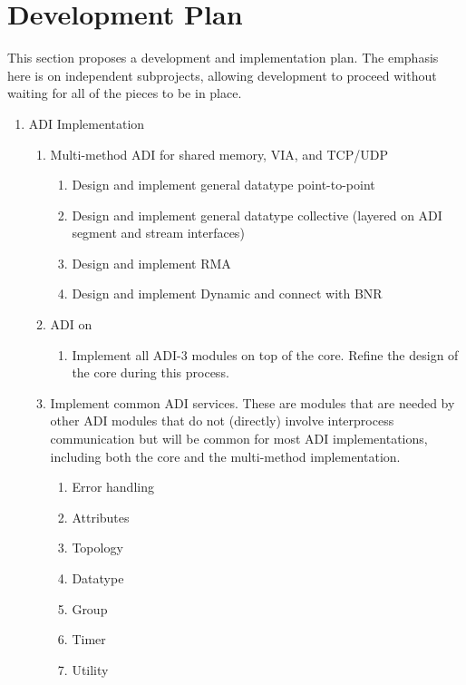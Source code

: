 \documentclass{article}
\begin{document}
\section{Development Plan}
\label{sec:development}
This section proposes a development and implementation plan.  The
emphasis here is on independent subprojects, allowing development to
proceed without waiting for all of the pieces to be in place.

\begin{enumerate}
\item ADI Implementation
    \begin{enumerate}
    \item Multi-method ADI for shared memory, VIA, and TCP/UDP
        \begin{enumerate}
        \item Design and implement general datatype point-to-point
        \item Design and implement general datatype collective
        (layered on ADI segment and stream interfaces)
        \item Design and implement RMA
        \item Design and implement Dynamic and connect with BNR
        \end{enumerate}
    \item ADI on 
        \begin{enumerate}
        \item Implement all ADI-3 modules on top of the core.  Refine
        the design of the core during this process.   
        \end{enumerate}
    \item Implement common ADI services.  These are modules that are
    needed by other ADI modules that do not (directly) involve
    interprocess communication but will be common for most ADI
    implementations, including both the core and the multi-method
    implementation. 
        \begin{enumerate}
        \item Error handling
        \item Attributes
        \item Topology
        \item Datatype
        \item Group
        \item Timer
        \item Utility
        \end{enumerate}
    \end{enumerate}

\end{enumerate}
\end{document}
